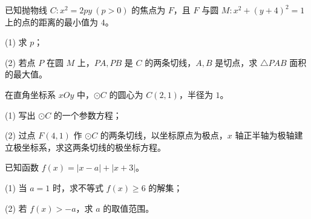 \begin{question}
已知抛物线 $C:x^2=2py\ (p>0)$ 的焦点为 $F$，且 $F$ 与圆 $M:x^2+(y+4)^2=1$ 上的点的距离的最小值为 $4$。

  (1) 求 $p$；

  (2) 若点 $P$ 在圆 $M$ 上，$PA,PB$ 是 $C$ 的两条切线，$A,B$ 是切点，求 $\triangle PAB$ 面积的最大值。

\end{question}
\begin{question}
在直角坐标系 $xOy$ 中，$\odot C$ 的圆心为 $C(2,1)$，半径为 $1$。

  (1) 写出 $\odot C$ 的一个参数方程；

  (2) 过点 $F(4,1)$ 作 $\odot C$ 的两条切线，以坐标原点为极点，$x$ 轴正半轴为极轴建立极坐标系，求这两条切线的极坐标方程。

\end{question}
\begin{question}
已知函数 $f(x)=|x-a|+|x+3|$。

  (1) 当 $a=1$ 时，求不等式 $f(x)\geqslant6$ 的解集；

  (2) 若 $f(x)>-a$，求 $a$ 的取值范围。

\makeatletter{}\ifx\@currenvir\gkanswerblock\else\clearpage\fi\makeatother

\end{question}